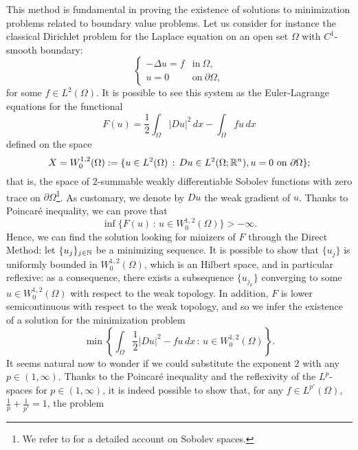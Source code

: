 This method is fundamental in proving the existence of solutions to minimization problems related to boundary value problems. Let us consider for instance the classical Dirichlet problem for the Laplace equation on an open set $\Omega$ with $C^{1}$-smooth boundary:
\begin{equation*}
\begin{cases} 
- \Delta u = f & \text{in} \ \Omega, \\
u = 0 & \text{on} \ \partial \Omega,
\end{cases}
\end{equation*}
for some $f \in L^{2}(\Omega)$.
It is possible to see this system as the Euler-Lagrange equations for the functional
\begin{equation*}
F(u) = \frac{1}{2} \int_{\Omega} |D u|^{2} \, dx - \int_{\Omega} f u \, dx
\end{equation*}
defined on the space 
\begin{equation*}
X = W^{1, 2}_{0}(\Omega) := \{ u \in L^{2}(\Omega) \, : \,  Du \in L^{2}(\Omega; \mathbb{R}^{n}), u = 0 \ \text{on} \ \partial \Omega \};
\end{equation*}
that is, the space of $2$-summable weakly differentiable Sobolev functions with zero trace on $\partial \Omega$\footnote{We refer to \cite[Chapter 4]{evans2015measure} for a detailed account on Sobolev spaces.}. As customary, we denote by $Du$ the weak gradient of $u$.
Thanks to Poincar\'e inequality, we can prove that 
\begin{equation*}
\inf \{ F(u) \, :\, u \in W^{1, 2}_{0}(\Omega) \} > - \infty.
\end{equation*}
Hence, we can find the solution looking for minizers of $F$ through the Direct Method: let $\{u_{j}\}_{j \in \mathbb{N}}$ be a minimizing sequence. It is possible to show that $\{u_{j}\}$ is uniformly bounded in $W^{1, 2}_{0}(\Omega)$, which is an Hilbert space, and in particular reflexive: as a consequence, there exists a subsequence $\{u_{j_{k}}\}$ converging to some $u \in W^{1, 2}_{0}(\Omega)$ with respect to the weak topology. In addition, $F$ is lower semicontinuous with respect to the weak topology, and so we infer the existence of a solution for the minimization problem
\begin{equation*}
\min \left \{ \int_{\Omega} \frac{1}{2} |D u|^{2} - f u \, dx \, : \, u \in W^{1, 2}_{0}(\Omega) \right \}.
\end{equation*}
It seems natural now to wonder if we could substitute the exponent $2$ with any $p \in (1, \infty)$. Thanks to the Poincar\'e inequality and the reflexivity of the $L^{p}$-spaces for $p \in (1, \infty)$, it is indeed possible to show that, for any $f \in L^{p'}(\Omega)$, $\frac{1}{p} + \frac{1}{p'} = 1$, the problem
